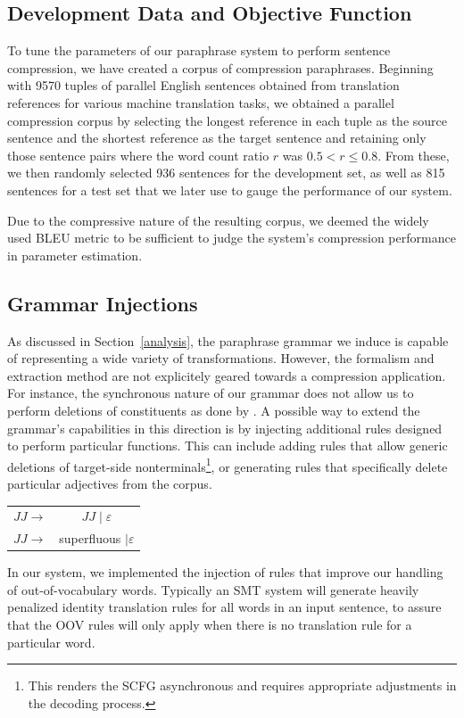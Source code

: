 \documentclass[11pt]{article}
\begin{document}
\subsection{Development Data and Objective Function}
To tune the parameters of our paraphrase system to perform sentence
compression, we have created a corpus of compression
paraphrases. Beginning with 9570 tuples of parallel English sentences
obtained from translation references for various machine translation
tasks, we obtained a parallel compression corpus by selecting the
longest reference in each tuple as the source sentence and the
shortest reference as the target sentence and retaining only those
sentence pairs where the word count ratio $r$ was $0.5 < r \leq
0.8$. From these, we then randomly selected 936 sentences for the
development set, as well as 815 sentences for a test set that we later
use to gauge the performance of our system.

Due to the compressive nature of the resulting corpus, we deemed the
widely used BLEU metric \cite{Papineni2002} to be sufficient to judge
the system's compression performance in parameter estimation.



\subsection{Grammar Injections} \label{injection}

As discussed in Section~\ref{analysis}, the paraphrase grammar we
induce is capable of representing a wide variety of
transformations. However, the formalism and extraction method are not
explicitely geared towards a compression application. For instance,
the synchronous nature of our grammar does not allow us to perform
deletions of constituents as done by .  A possible
way to extend the grammar's capabilities in this direction is by
injecting additional rules designed to perform particular
functions. This can include adding rules that allow generic deletions
of target-side nonterminals\footnote{This renders the SCFG
  asynchronous and requires appropriate adjustments in the decoding
  process.}, or generating rules that specifically delete particular
adjectives from the corpus.
\begin{center}
\begin{tabular}{cc}
 $\mathit{JJ} \rightarrow$ & $\mathit{JJ} \mid \varepsilon$ \\
 $\mathit{JJ} \rightarrow$ & superfluous $\mid \varepsilon$ \\
\end{tabular}
\end{center}
In our system, we implemented the injection of rules that improve our
handling of out-of-vocabulary words. Typically an SMT system will
generate heavily penalized identity translation rules for all words in
an input sentence, to assure that the OOV rules will only apply when
there is no translation rule for a particular word.
\end{document}
